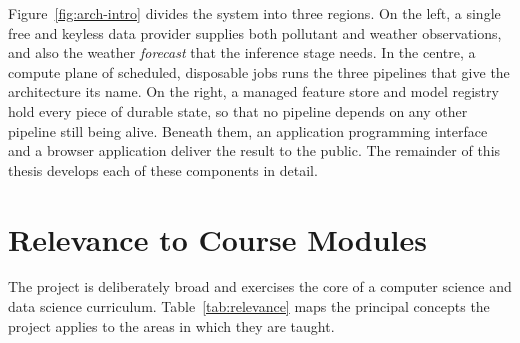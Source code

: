 
Figure~\ref{fig:arch-intro} divides the system into three regions. On the left, a
single free and keyless data provider supplies both pollutant and weather
observations, and also the weather \emph{forecast} that the inference stage needs.
In the centre, a compute plane of scheduled, disposable jobs runs the three
pipelines that give the architecture its name. On the right, a managed feature
store and model registry hold every piece of durable state, so that no pipeline
depends on any other pipeline still being alive. Beneath them, an application
programming interface and a browser application deliver the result to the public.
The remainder of this thesis develops each of these components in detail.

\section{Relevance to Course Modules}
The project is deliberately broad and exercises the core of a computer science
and data science curriculum. Table~\ref{tab:relevance} maps the principal
concepts the project applies to the areas in which they are taught.

